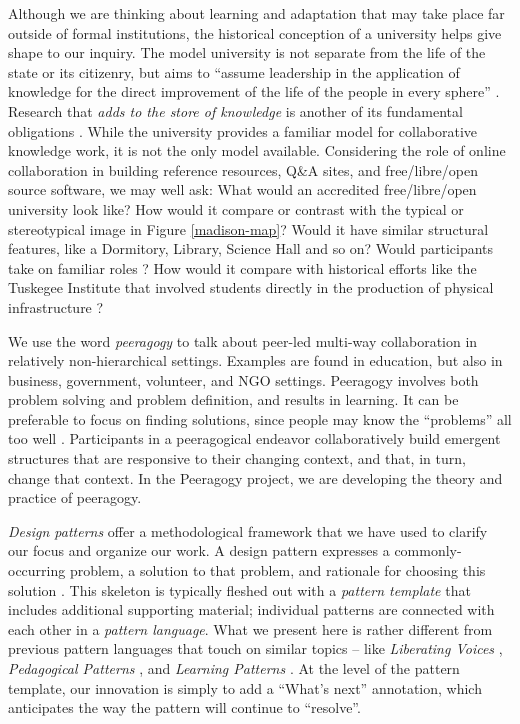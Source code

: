 Although we are thinking about learning and adaptation that
may take place far outside of formal institutions, the historical
conception of a university helps give shape to our inquiry.
%
The model university is not separate from the life of the state or its
citizenry, but aims to ``assume leadership in the application of
knowledge for the direct improvement of the life of the people in
every sphere'' \cite[p.~88]{curti1949university}. Research that
\emph{adds to the store of knowledge} is another of its fundamental
obligations \cite[p.~550]{curti1949university}.
While the university provides a familiar model for collaborative
knowledge work, it is not the only model available.
Considering the role of online collaboration in building reference resources,
Q\&A sites, and free\slash libre\slash open source software, we may
well ask: What would an accredited free\slash libre\slash open
university look like?  How would it compare or contrast with the
typical or stereotypical image in Figure
\ref{madison-map}?  Would it have similar structural features, like a
Dormitory, Library, Science Hall and so on?  Would participants take
on familiar roles \cite{corneli+crowdsourcing}?  How would it compare
with historical efforts like the Tuskegee Institute that involved
students directly in the production of physical infrastructure
\cite{washington1986up,building-peeragogy-accelerator}?

We use the word \emph{peeragogy} to talk about peer-led multi-way collaboration
in relatively non-hierarchical settings.  Examples are found in
education, but also in business, government, volunteer, and NGO
settings.  Peeragogy involves both problem solving and problem
definition, and results in learning.  It can be preferable to
focus on finding solutions, since people may know the ``problems'' all too well
\cite{ariyaratneXorganizationX1977}.  Participants in a peeragogical
endeavor collaboratively build emergent structures that are responsive
to their changing context, and that, in turn, change that context.  In
the Peeragogy project, we are developing the theory and practice of
peeragogy.

\emph{Design patterns} offer a methodological framework that we have
used to clarify our focus and organize our work.  A design pattern
expresses a commonly-occurring problem, a solution to that problem,
and rationale for choosing this solution \cite{meszaros1998pattern}.
This skeleton is typically fleshed out with a \emph{pattern template}
that includes additional supporting material; individual patterns are
connected with each other in a \emph{pattern language}.  What we
present here is rather different from previous pattern languages that touch
on similar topics -- like \emph{Liberating Voices}
\cite{schuler2008liberating}, \emph{Pedagogical Patterns}
\cite{bergin2012pedagogical}, and \emph{Learning Patterns}
\cite{iba2014learning}.  At the level of the pattern template, our
innovation is simply to add a ``What's next'' annotation, which
anticipates the way the pattern will continue to ``resolve''.

